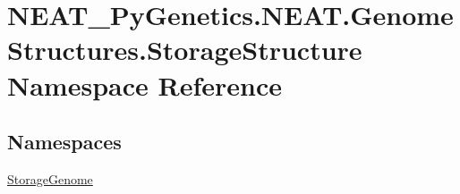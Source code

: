 \hypertarget{namespaceNEAT__PyGenetics_1_1NEAT_1_1GenomeStructures_1_1StorageStructure}{}\section{N\+E\+A\+T\+\_\+\+Py\+Genetics.\+N\+E\+A\+T.\+Genome\+Structures.\+Storage\+Structure Namespace Reference}
\label{namespaceNEAT__PyGenetics_1_1NEAT_1_1GenomeStructures_1_1StorageStructure}
\subsection*{Namespaces}
\begin{DoxyCompactItemize}
\item 
 \hyperlink{namespaceNEAT__PyGenetics_1_1NEAT_1_1GenomeStructures_1_1StorageStructure_1_1StorageGenome}{Storage\+Genome}
\end{DoxyCompactItemize}
